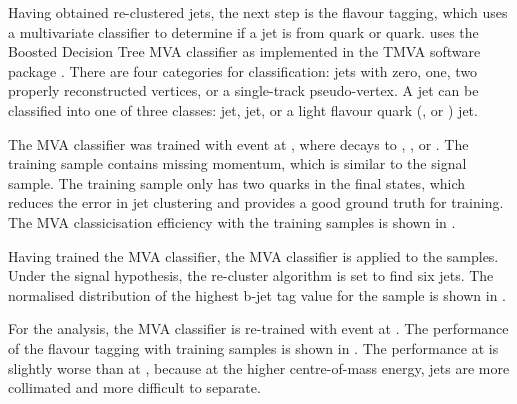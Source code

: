 Having obtained re-clustered jets, the next step is the flavour tagging, which uses a multivariate classifier to determine if a jet is from \Pbottom quark or \Pcharm quark. \lcfiplus uses the Boosted Decision Tree MVA \multiclass classifier as implemented in the TMVA software package \cite{Hocker:2007ht}. There are four categories for classification:  jets with zero, one, two properly reconstructed vertices, or a single-track pseudo-vertex. A jet can be classified into one of three classes: \Pbottom jet, \Pcharm jet, or a light flavour quark (\Pup, \Pdown or \Pstrange) jet.

The MVA \multiclass classifier was trained with \HepProcess{\Pep \Pem \to \PZ \APnu \Pnu} event at , where \PZ decays to \HepProcess{\Pbottom\APbottom}, \HepProcess{\Pcharm\APcharm}, or \HepProcess{\Pup\APup/\Pdown\APdown/\Pstrange\APstrange}. The training sample contains missing momentum, which is similar to the signal sample. The training sample only has two quarks in the final states, which reduces the error in jet clustering and provides a good ground truth for training. The MVA classicisation efficiency with the training samples is shown in .

Having trained the MVA classifier, the MVA classifier is applied to the samples. Under the signal hypothesis, the re-cluster algorithm is set to find six jets. The normalised distribution of the highest b-jet tag value for the \eeToHHbbWWHad sample is shown in .

For the  analysis, the MVA classifier is re-trained with  \HepProcess{\Pep \Pem \to \PZ \APnu \Pnu} event at . The performance of the flavour tagging  with training samples is shown in . The performance at  is slightly worse than at , because at the higher centre-of-mass energy, jets are more collimated and more difficult to separate.





